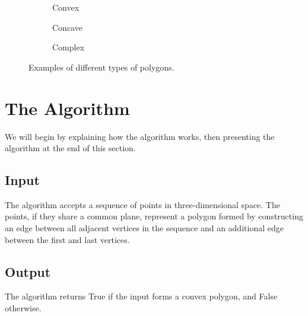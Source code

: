 \documentclass{article}
\begin{document}
\begin{figure}[htbp]
	\centering
	\begin{subfigure}{0.25\textwidth}
		\centering
		\caption{Convex}
	\end{subfigure}%
	\begin{subfigure}{0.25\textwidth}
		\centering
		\caption{Concave}
	\end{subfigure}%
	\begin{subfigure}{0.25\textwidth}
		\centering
		\caption{Complex}
	\end{subfigure}%
	\caption{Examples of different types of polygons.}
	\label{}
\end{figure}

\section{The Algorithm}

We will begin by explaining how the algorithm works, then presenting the algorithm at the end of this section.

\subsection{Input}

The algorithm accepts a sequence of points in three-dimensional space. The points, if they share a common plane, represent a polygon formed by constructing an edge between all adjacent vertices in the sequence and an additional edge between the first and last vertices.

\subsection{Output}

The algorithm returns True if the input forms a convex polygon, and False otherwise.
\end{document}
